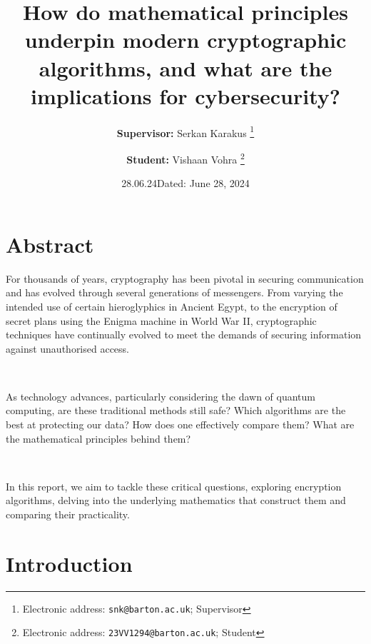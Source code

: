 \documentclass[11pt]{article}
\date{28.06.24} %
\begin{document}
\title{How do mathematical principles underpin modern cryptographic algorithms, and what are the implications for cybersecurity?}

\author{\textbf{Supervisor:} Serkan Karakus%
  \thanks{Electronic address: \texttt{snk@barton.ac.uk};  Supervisor}}
\author{\textbf{Student:} Vishaan Vohra%
  \thanks{Electronic address: \texttt{23VV1294@barton.ac.uk};  Student}}

\date{Dated: June 28, 2024}
\maketitle
\newpage
\tableofcontents
\newpage

\section{Abstract}
For thousands of years, cryptography has been pivotal in securing communication and has evolved through several generations of messengers. From varying the intended use of certain hieroglyphics in Ancient Egypt, to the encryption of secret plans using the Enigma machine in World War II, cryptographic techniques have continually evolved to meet the demands of securing information against unauthorised access. 

\

As technology advances, particularly considering the dawn of quantum computing, are these traditional methods still safe? Which algorithms are the best at protecting our data? How does one effectively compare them? What are the mathematical principles behind them?

\

In this report, we aim to tackle these critical questions, exploring encryption algorithms, delving into the underlying mathematics that construct them and comparing their practicality.


\section{Introduction}
\end{document}
